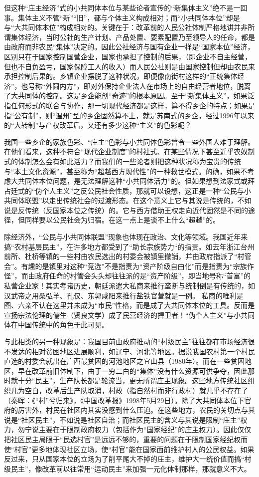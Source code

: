 \documentclass[a4paper,12pt,punct=kaiming]{ctexart}
\begin{document}
但这种“庄主经济”式的小共同体本位与某些论者宣传的“新集体主义”绝不是一回事。集体主义不管“新”“旧”，都与个体主义构成相对；而“小共同体本位”却是与“大共同体本位”构成相对的。关键在于：改革前的人民公社体制严格地讲并非所谓集体经济，当时公社的生产计划、产品处置、要素配置乃至领导人的任命，都是由政府而非农民“集体”决定的。因此公社经济与国有企业一样是“国家本位”经济，区别只在于国家控制国营企业，国家也承担了控制的后果，（即企业不自主经营，但也不自负盈亏，国家保障工人的收入）而人民公社则是由国家控制但却由农民来承担控制后果的。乡镇企业摆脱了这种状况，即便像南街村这样的“正统集体经济”，也号称“外圆内方”，即对外保持企业法人在市场上的自由经营者地位，脱离了大共同体的控制。这是乡企能创“奇迹”的根本原因。至于“新集体主义”，如果泛指任何形式的联合与协作，那一切现代经济都是这样，算不得乡企的特点；如果是指“公有制”，则“温州”型的乡企固然算不上，就是苏南式的乡企，经过1996年以来的“大转制”与产权改革后，又还有多少这种“主义”的色彩呢？

我国一些乡企的家族色彩、“庄主”色彩与小共同体色彩曾令一些外国人难于理解。在他们看来，这种不符合“现代企业制度”的村社式、在某些情况下甚至近乎农奴制式的体制怎么会有如此活力？而我们的一些论者则把这种状况称为宝贵的传统与“本土文化资源”，甚至称为“超越西方现代性”的一种救世模式。的确，如果不考虑大共同体本位问题，是无法理解这种“小共同体活力”的。但如果想到法家式或拜占廷式的“伪个人主义”之反公民社会性质，那就可以设想，这正是一种“公民与小共同体联盟”以走出传统社会的过渡形态。在这个意义上它与其说是传统的，不如说是反传统（反国家本位之传统）的。它与西方借助王权走向近代固然是不同的途径，但同样要以公民社会为归宿。在这一点上是谈不上什么“超越”的。

除经济外，“公民与小共同体联盟”现象也体现在政治、文化等领域。我国近年来搞“农村基层民主”，在许多地方都受到了“助长宗族势力“的指责。如去年浙江台州前所、杜桥等镇的一些村由农民选出的村委会被镇里撤销，并由政府指派了“村管会”。有趣的是镇里对这种“竞选”不是指责为“资产阶级自由化”而是指责为“宗族作怪”，而由政府任命的村管会头头却往往派的是“资产阶级”，即当地号称“首富”的私营企业家！其实考诸历史，朝廷派遣大私商来推行垄断与统制倒是有传统的，如汉武帝之用桑弘羊、孔仅、东郭咸阳来推行盐铁官营就是一例。 私商的唯利是图、六亲不认在这里并未成为“市民”性格，而是成了大共同体本位的工具。反而是宣扬宗法伦理的儒生（贤良文学）成了民营经济的捍卫者！“伪个人主义”与小共同体在中国传统中的角色于此可见。

与此相类的另一种现象是：我国目前由政府推动的“村级民主”往往都在市场经济很不发达的相对贫困地区进展顺利，如辽宁、河北等地区。据说我国农村第一个村民直选的村委会就出在广西最贫困的河池地区之宜山县（1980年）。而在一些贫困地区，早在改革前旧体制下，由于一穷二白的“集体”没有什么资源可供争夺，因此那时就十分“民主”，生产队长都是轮流当，更无所谓庄主现象。这些地方传统社区组织几为空白，改革后生产队取消，村政（指自然村而非行政村）就几乎不存在了（秦晖：《“村”兮归来》，《中国改革报》1998年5月29日）。除了大共同体本位下官府的厉害外，村民在社区内其实没感到什么压迫。在这些地方，农民的关切点与其说是“社区民主”，不如说是社区自治；而社区民主的含义与其说是限制“庄主”权力，勿宁说主要在于限制政府权力（包括作为“国家经纪”的庄主权力）。因此仅仅把社区民主局限于“民选村官”是远远不够的，重要的问题在于限制国家经纪权而使“村官”更多地体现社区立场，使“村官”能在国家面前维护村人的公民权益。如果反过来，只从国家本位的立场为了削平尾大不掉的庄主，维护大一统价值而搞“村级民主”，像改革前以往常用“运动民主”来加强一元化体制那样，那就意义不大。
\end{document}
